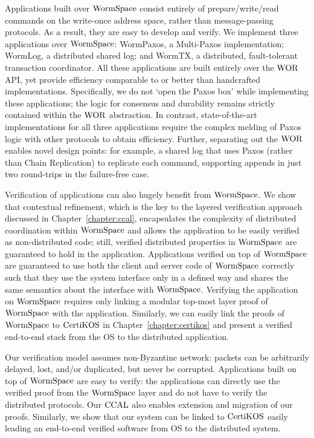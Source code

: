 Applications built over $\mathrm{WormSpace}$ consist entirely of prepare/write/read commands on the write-once address space, rather than message-passing protocols. As a result, they are easy to develop and verify. We implement three applications over $\mathrm{WormSpace}$: WormPaxos, a Multi-Paxos implementation; WormLog, a distributed shared log; and WormTX, a distributed, fault-tolerant transaction coordinator. All these applications are built entirely over the $\mathrm{WOR}$ API, yet provide efficiency comparable to or better than handcrafted implementations. Specifically, we do not `open the Paxos box' while implementing these applications; the logic for consensus and durability remains strictly contained within the $\mathrm{WOR}$ abstraction. In contrast, state-of-the-art implementations for all three applications require the complex melding of Paxos logic with other protocols to obtain efficiency. Further, separating out the $\mathrm{WOR}$ enables novel design points: for example, a shared log that uses Paxos (rather than Chain Replication) to replicate each command, supporting appends in just two round-trips in the failure-free case.

Verification of applications can also hugely benefit from $\mathrm{WormSpace}$. We show that contextual refinement, which is the key to the layered verification approach discussed in Chapter~\ref{chapter:ccal}, encapsulates the complexity of distributed coordination within $\mathrm{WormSpace}$ and allows the application to be easily verified as non-distributed code; still, verified distributed properties in $\mathrm{WormSpace}$ are guaranteed to hold in the application. Applications verified on top of $\mathrm{WormSpace}$ are guaranteed to use both the client and server code of $\mathrm{WormSpace}$ correctly such that they use the system interface only in a defined way and shares the same semantics about the interface with $\mathrm{WormSpace}$. Verifying the application on $\mathrm{WormSpace}$ requires only linking a modular top-most layer proof of $\mathrm{WormSpace}$ with the application. Similarly, we can easily link the proofs of $\mathrm{WormSpace}$ to $\mathrm{CertiKOS}$ in Chapter~\ref{chapter:certikos} and present a verified end-to-end stack from the OS to the distributed application.

Our verification model assumes non-Byzantine network: packets can be arbitrarily delayed, lost, and/or duplicated, but never be corrupted. Applications built on top of $\mathrm{WormSpace}$ are easy to verify: the applications can directly use the verified proof from the $\mathrm{WormSpace}$ layer and do not have to verify the distributed protocols. Our $\mathrm{CCAL}$ also enables extension and migration of our proofs. Similarly, we show that our system can be linked to $\mathrm{CertiKOS}$ easily leading an end-to-end verified software from OS to the distributed system.



